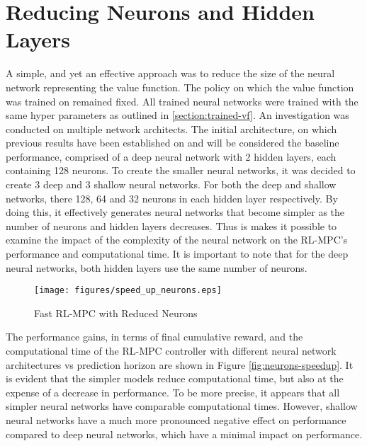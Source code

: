 \section{Reducing Neurons and Hidden Layers}
A simple, and yet an effective approach was to reduce the size of the neural network representing the value function. The policy on which the value function was trained on remained fixed. All trained neural networks were trained with the same hyper parameters as outlined in \autoref{section:trained-vf}. An investigation was conducted on multiple network architects. The initial architecture, on which previous results have been established on and will be considered the baseline performance, comprised of a deep neural network with 2 hidden layers, each containing 128 neurons.
To create the smaller neural networks, it was decided to create 3 deep and 3 shallow neural networks. For both the deep and shallow networks, there 128, 64 and 32 neurons in each hidden layer respectively. By doing this, it effectively generates neural networks that become simpler as the number of neurons and hidden layers decreases. Thus is makes it possible to examine the impact of the complexity of the neural network on the RL-MPC's performance and computational time. It is important to note that for the deep neural networks, both hidden layers use the same number of neurons. 

\begin{figure}[H]
	\centering
	\texttt{[image: figures/speed\_up\_neurons.eps]}
	\caption{Fast RL-MPC with Reduced Neurons}
	\label{fig:neurons-speedup}
\end{figure}

The performance gains, in terms of final cumulative reward, and the computational time of the RL-MPC controller with different neural network architectures vs prediction horizon are shown in Figure \autoref{fig:neurons-speedup}. It is evident that the simpler models reduce computational time, but also at the expense of a decrease in performance. To be more precise, it appears that all simpler neural networks have comparable computational times. However, shallow neural networks have a much more pronounced negative effect on performance compared to deep neural networks, which have a minimal impact on performance.


